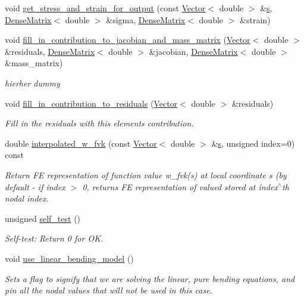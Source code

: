 \begin{DoxyCompactItemize}
\item 
void \hyperlink{classoomph_1_1DisplacementBasedFoepplvonKarmanEquations_a4382eef3eb303d5429d6b3edd1d1c6c5}{get\+\_\+stress\+\_\+and\+\_\+strain\+\_\+for\+\_\+output} (const \hyperlink{classoomph_1_1Vector}{Vector}$<$ double $>$ \&\hyperlink{cfortran_8h_ab7123126e4885ef647dd9c6e3807a21c}{s}, \hyperlink{classoomph_1_1DenseMatrix}{Dense\+Matrix}$<$ double $>$ \&sigma, \hyperlink{classoomph_1_1DenseMatrix}{Dense\+Matrix}$<$ double $>$ \&strain)
\item 
void \hyperlink{classoomph_1_1DisplacementBasedFoepplvonKarmanEquations_a9c6a54fd6c46014805f5d3d55220e35b}{fill\+\_\+in\+\_\+contribution\+\_\+to\+\_\+jacobian\+\_\+and\+\_\+mass\+\_\+matrix} (\hyperlink{classoomph_1_1Vector}{Vector}$<$ double $>$ \&residuals, \hyperlink{classoomph_1_1DenseMatrix}{Dense\+Matrix}$<$ double $>$ \&jacobian, \hyperlink{classoomph_1_1DenseMatrix}{Dense\+Matrix}$<$ double $>$ \&mass\+\_\+matrix)
\begin{DoxyCompactList}\small\item\em hierher dummy \end{DoxyCompactList}\item 
void \hyperlink{classoomph_1_1DisplacementBasedFoepplvonKarmanEquations_ae5b7e25d861df6134d1ea4457e6e1880}{fill\+\_\+in\+\_\+contribution\+\_\+to\+\_\+residuals} (\hyperlink{classoomph_1_1Vector}{Vector}$<$ double $>$ \&residuals)
\begin{DoxyCompactList}\small\item\em Fill in the residuals with this element\textquotesingle{}s contribution. \end{DoxyCompactList}\item 
double \hyperlink{classoomph_1_1DisplacementBasedFoepplvonKarmanEquations_aac329f225fd5f309b23da3299fefdec1}{interpolated\+\_\+w\+\_\+fvk} (const \hyperlink{classoomph_1_1Vector}{Vector}$<$ double $>$ \&\hyperlink{cfortran_8h_ab7123126e4885ef647dd9c6e3807a21c}{s}, unsigned index=0) const
\begin{DoxyCompactList}\small\item\em Return FE representation of function value w\+\_\+fvk(s) at local coordinate s (by default -\/ if index $>$ 0, returns FE representation of valued stored at index$^\wedge$th nodal index. \end{DoxyCompactList}\item 
unsigned \hyperlink{classoomph_1_1DisplacementBasedFoepplvonKarmanEquations_a3e1ad8befd0561258f86c8e97da30744}{self\+\_\+test} ()
\begin{DoxyCompactList}\small\item\em Self-\/test\+: Return 0 for OK. \end{DoxyCompactList}\item 
void \hyperlink{classoomph_1_1DisplacementBasedFoepplvonKarmanEquations_a29d4c7f7789b70e49e6555971f6abc96}{use\+\_\+linear\+\_\+bending\+\_\+model} ()
\begin{DoxyCompactList}\small\item\em Sets a flag to signify that we are solving the linear, pure bending equations, and pin all the nodal values that will not be used in this case. \end{DoxyCompactList}\end{DoxyCompactItemize}
